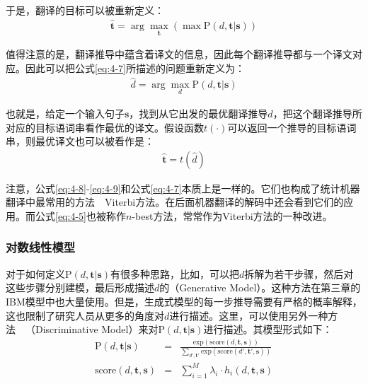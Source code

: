 \parinterval 于是，翻译的目标可以被重新定义：
\begin{eqnarray}
\hat{\mathbf{t}} = \arg\max_{\mathbf{t}} (\max \textrm{P}(d,\mathbf{t}|\mathbf{s}))
\label{eq:4-7}
\end{eqnarray}

\parinterval 值得注意的是，翻译推导中蕴含着译文的信息，因此每个翻译推导都与一个译文对应。因此可以把公式\ref{eq:4-7}所描述的问题重新定义为：
\begin{eqnarray}
\hat{d} = \arg\max_{d} \textrm{P}(d,\mathbf{t}|\mathbf{s})
\label{eq:4-8}
\end{eqnarray}

\parinterval 也就是，给定一个输入句子$\mathbf{s}$，找到从它出发的最优翻译推导$\hat{d}$，把这个翻译推导所对应的目标语词串看作最优的译文。假设函数$t(\cdot)$可以返回一个推导的目标语词串，则最优译文也可以被看作是：
\begin{eqnarray}
\hat{\mathbf{t}} = t(\hat{d})
\label{eq:4-9}
\end{eqnarray}

\parinterval 注意，公式\ref{eq:4-8}-\ref{eq:4-9}和公式\ref{eq:4-7}本质上是一样的。它们也构成了统计机器翻译中最常用的方法\ \dash \ Viterbi方法\cite{DBLP:journals/tit/Viterbi67}。在后面机器翻译的解码中还会看到它们的应用。而公式\ref{eq:4-5}也被称作$n$-best方法，常常作为Viterbi方法的一种改进。


\subsubsection{对数线性模型}

\parinterval 对于如何定义$\textrm{P}(d,\mathbf{t}|\mathbf{s})$有很多种思路，比如，可以把$d$拆解为若干步骤，然后对这些步骤分别建模，最后形成描述$d$的{\small{}}（Generative Model）。这种方法在第三章的IBM模型中也大量使用。但是，生成式模型的每一步推导需要有严格的概率解释，这也限制了研究人员从更多的角度对$d$进行描述。这里，可以使用另外一种方法\ \dash \ {\small{}}（Discriminative Model）来对$\textrm{P}(d,\mathbf{t}|\mathbf{s})$进行描述\cite{DBLP:conf/acl/OchN02}。其模型形式如下：
\begin{eqnarray}
\textrm{P}(d,\mathbf{t}|\mathbf{s}) &=& \frac{\textrm{exp}(\textrm{score}(d,\mathbf{t},\mathbf{s}))}{\sum_{d',\mathbf{t}'} \textrm{exp}(\textrm{score}(d',\mathbf{t}',\mathbf{s}))} \label{eqa4.10} \\
\textrm{score}(d,\mathbf{t},\mathbf{s}) &=& \sum_{i=1}^{M} \lambda_i \cdot h_i (d,\mathbf{t},\mathbf{s})
\label{eq:4-11}
\end{eqnarray}

